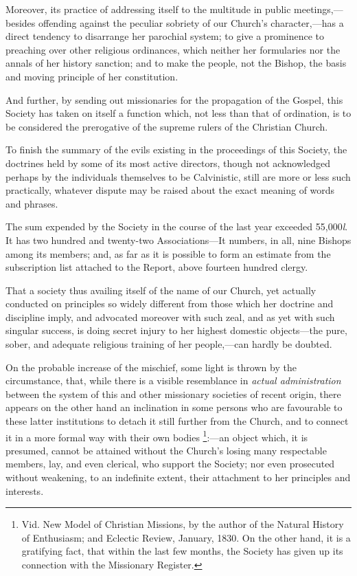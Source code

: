 Moreover, its practice of addressing itself to
the multitude in public meetings,—besides offending against the
peculiar sobriety of our Church's character,—has a direct tendency
to disarrange her parochial system; to give a prominence to
preaching over other religious ordinances, which neither her
formularies nor the annals of her history sanction; and to make the
people, not the Bishop, the basis and moving principle of her
constitution.

And further, by sending out missionaries for the
propagation of the Gospel, this Society has taken on itself a function
which, not less than that of ordination, is to be considered the
prerogative of the supreme rulers of the Christian Church.

To finish the summary of the evils existing in
the proceedings of this Society, the doctrines held by some of its
most active directors, though not acknowledged perhaps by the
individuals themselves to be Calvinistic, still are more or less such
practically, whatever dispute may be raised about the exact meaning of
words and phrases.

The sum expended by the Society in the course of
the last year exceeded 55,000\emph{l}. It has two hundred and
twenty-two Associations—It numbers, in all, nine Bishops among its
members; and, as far as it is possible to form an estimate from the
subscription list attached to the Report, above fourteen hundred
clergy.

That a society thus availing itself of the name
of our Church, yet actually conducted on principles so widely
different from those which her doctrine and discipline imply, and
advocated moreover with such zeal, and as yet with such singular
success, is doing secret injury to her highest domestic objects—the
pure, sober, and adequate religious training of her people,—can
hardly be doubted.

On the probable increase of the mischief, some
light is thrown by the circumstance, that, while there is a visible
resemblance in \emph{actual administration} between the system of this
and other missionary societies of recent origin, there appears on the
other hand an inclination in some persons who are favourable to these
latter institutions to detach it still further from the Church,
and to connect it in a more formal way with their own bodies \footnote{Vid. New Model of Christian Missions, by the
author of the Natural History of Enthusiasm; and Eclectic Review,
January, 1830. On the other hand, it is a gratifying fact, that within
the last few months, the Society has given up its connection with the
Missionary Register.}:—an
object which, it is presumed, cannot be attained without the Church's
losing many respectable members, lay, and even clerical, who support
the Society; nor even prosecuted without weakening, to an indefinite
extent, their attachment to her principles and interests.

